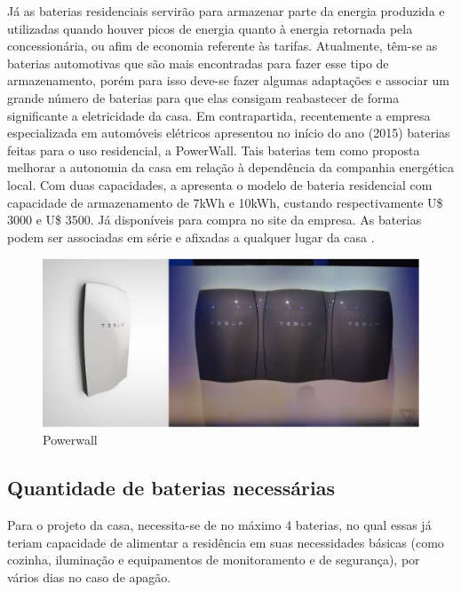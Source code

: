 	Já as baterias residenciais servirão para armazenar parte da energia produzida e utilizadas quando houver picos de energia quanto à energia retornada pela concessionária, ou afim de economia referente às tarifas. Atualmente, têm-se as baterias automotivas que são mais encontradas para fazer esse tipo de armazenamento, porém para isso deve-se fazer algumas adaptações e associar um grande número de baterias para que elas consigam reabastecer de forma significante a eletricidade da casa. Em contrapartida, recentemente a empresa especializada em automóveis elétricos \cite{TESLA} apresentou no início do ano (2015) baterias feitas para o uso residencial, a PowerWall. Tais baterias tem como proposta melhorar a autonomia da casa em relação à dependência da companhia energética local. Com duas capacidades, a \cite{TESLA} apresenta o modelo de bateria residencial com capacidade de armazenamento de 7kWh e 10kWh, custando respectivamente U\$ 3000 e U\$ 3500. Já disponíveis para compra no site da empresa. As baterias podem ser associadas em série e afixadas a qualquer lugar da casa \cite{TESLA}.

\begin{figure}[H]
  \begin{center}
	\includegraphics[keepaspectratio,scale=1]{figuras/powerwall.eps}
	\caption{Powerwall\cite{TESLA}}
  \end{center}
\end{figure}

\subsection{Quantidade de baterias necessárias}

	Para o projeto da casa, necessita-se de no máximo 4 baterias, no qual essas já teriam capacidade de alimentar a residência em suas necessidades básicas (como cozinha, iluminação e equipamentos de monitoramento e de segurança), por vários dias no caso de apagão.

